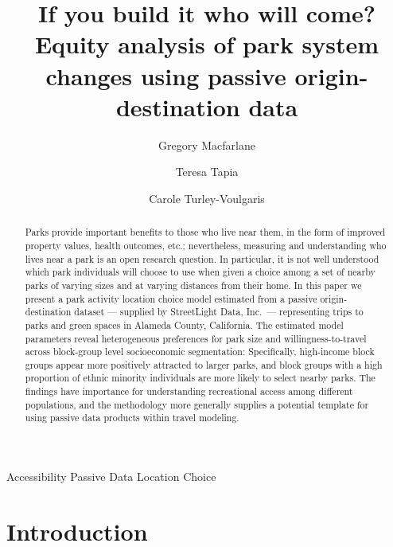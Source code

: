\documentclass[]{elsarticle} %
\begin{document}
\begin{frontmatter}

  \title{If you build it who will come? Equity analysis of park system changes using passive origin-destination data}
    \author[Brigham Young University]{Gregory Macfarlane}
    \author[]{Teresa Tapia}
    \author[Harvard Graduate School of Design]{Carole Turley-Voulgaris}
      \address[Brigham Young University]{Civil and Environmental Engineering Department, 430 Engineering Building, Provo, Utah 84602}
    \address[Harvard University]{Some Other Place}
  
  \begin{abstract}
  Parks provide important benefits to those who live near them, in the form of improved property values, health outcomes, etc.; nevertheless, measuring and understanding who lives near a park is an open research question. In particular, it is not well understood which park individuals will choose to use when given a choice among a set of nearby parks of varying sizes and at varying distances from their home. In this paper we present a park activity location choice model estimated from a passive origin-destination dataset --- supplied by StreetLight Data, Inc.~--- representing trips to parks and green spaces in Alameda County, California. The estimated model parameters reveal heterogeneous preferences for park size and willingness-to-travel across block-group level socioeconomic segmentation: Specifically, high-income block groups appear more positively attracted to larger parks, and block groups with a high proportion of ethnic minority individuals are more likely to select nearby parks. The findings have importance for understanding recreational access among different populations, and the methodology more generally supplies a potential template for using passive data products within travel modeling.
  \end{abstract}
   \begin{keyword} Accessibility Passive Data Location Choice\end{keyword}
 \end{frontmatter}

\hypertarget{intro}{%
\section{Introduction}\label{intro}}
\end{document}
